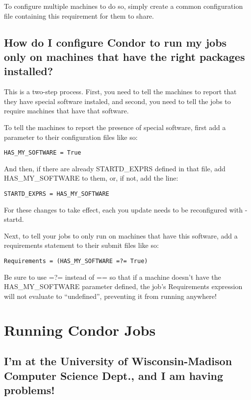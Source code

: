 To configure multiple machines to do so, simply create a common
configuration file containing this requirement for them to share.

\subsection{How do I configure Condor to run my jobs only on machines
that have the right packages installed?}

This is a two-step process.
First, you need to tell the machines to report that they have special
software instaled, and second, you need to tell the jobs to require
machines that have that software.

To tell the machines to report the presence of special software, first
add a parameter to their configuration files like so:

\begin{verbatim}HAS_MY_SOFTWARE = True\end{verbatim}

And then, if there are already STARTD\_EXPRS defined in that file, add
HAS\_MY\_SOFTWARE to them, or, if not, add the line:

\begin{verbatim}STARTD_EXPRS = HAS_MY_SOFTWARE\end{verbatim}

\Note For these changes to take effect, each  you update
needs to be reconfigured with  -startd.

Next, to tell your jobs to only run on machines that have this
software, add a requirements statement to their submit files like so:

\begin{verbatim}Requirements = (HAS_MY_SOFTWARE =?= True)\end{verbatim}

\Note Be sure to use =?= instead of == so that if a machine doesn't have
the HAS\_MY\_SOFTWARE parameter defined, the job's Requirements
expression will not evaluate to ``undefined'', preventing it from
running anywhere!


\section{Running Condor Jobs}

\subsection{I'm at the University of Wisconsin-Madison Computer
Science Dept., and I am having problems!}

